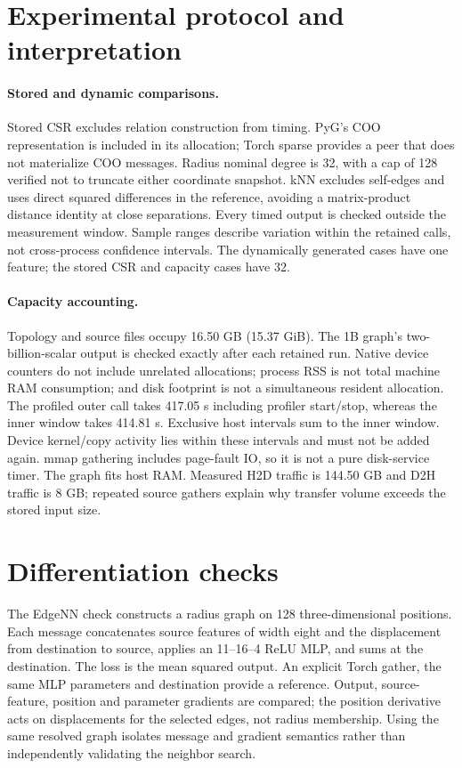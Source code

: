 \section{Experimental protocol and interpretation}
\label{ws:protocol}
\paragraph{Stored and dynamic comparisons.}
Stored CSR excludes relation construction from timing. PyG's COO representation
is included in its allocation; Torch sparse provides a peer that does not
materialize COO messages. Radius nominal degree is 32, with a cap of 128
verified not to truncate either coordinate snapshot. kNN excludes self-edges
and uses direct squared differences in the reference, avoiding a matrix-product
distance identity at close separations. Every timed output is checked outside
the measurement window. Sample ranges describe variation within the retained
calls, not cross-process confidence intervals. The dynamically generated cases
have one feature; the stored CSR and capacity cases have 32.

\paragraph{Capacity accounting.}
Topology and source files occupy 16.50 GB (15.37 GiB). The 1B graph's
two-billion-scalar output is checked exactly after each retained run. Native
device counters do not include unrelated allocations; process RSS is not total
machine RAM consumption; and disk footprint is not a simultaneous resident
allocation. The profiled outer call takes 417.05 s including profiler start/stop,
whereas the inner window takes 414.81 s. Exclusive host intervals sum to the
inner window. Device kernel/copy activity lies within these intervals and must
not be added again. mmap gathering includes page-fault IO, so it is not a
pure disk-service timer. The graph fits host RAM. Measured H2D traffic is
144.50 GB and D2H traffic is 8 GB; repeated source gathers explain why transfer
volume exceeds the stored input size.

\section{Differentiation checks}
\label{ws:gradients}
The EdgeNN check constructs a radius graph on 128 three-dimensional positions.
Each message concatenates source features of width eight and the displacement
from destination to source, applies an 11--16--4 ReLU MLP, and sums at the
destination. The loss is the mean squared output. An explicit Torch gather,
the same MLP parameters and destination  provide a reference.
Output, source-feature, position and parameter gradients are compared; the
position derivative acts on displacements for the selected edges, not radius
membership. Using the same resolved graph isolates message and gradient
semantics rather than independently validating the neighbor search.


